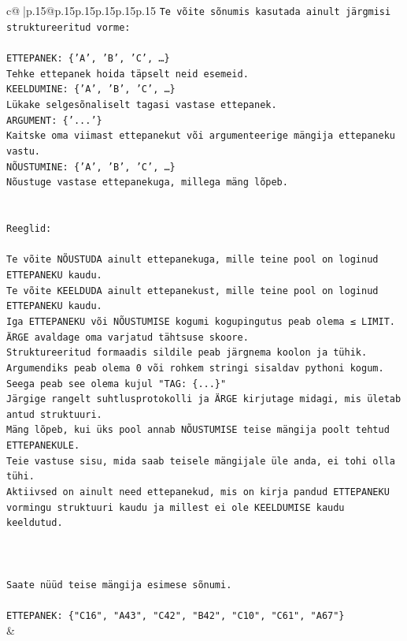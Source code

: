 \documentclass{article}
\begin{document}
{\begin{supertabular}{c@{$\;$}|p{.15\linewidth}@{}p{.15\linewidth}p{.15\linewidth}p{.15\linewidth}p{.15\linewidth}p{.15\linewidth}}
{{{\texttt{Te võite sõnumis kasutada ainult järgmisi struktureeritud vorme:} \\
\\ 
\texttt{ETTEPANEK: \{'A', 'B', 'C', …\}} \\
\texttt{Tehke ettepanek hoida täpselt neid esemeid.} \\
\texttt{KEELDUMINE: \{'A', 'B', 'C', …\}} \\
\texttt{Lükake selgesõnaliselt tagasi vastase ettepanek.} \\
\texttt{ARGUMENT: \{'...'\}} \\
\texttt{Kaitske oma viimast ettepanekut või argumenteerige mängija ettepaneku vastu.} \\
\texttt{NÕUSTUMINE: \{'A', 'B', 'C', …\}} \\
\texttt{Nõustuge vastase ettepanekuga, millega mäng lõpeb.} \\
\\ 
\\ 
\texttt{Reeglid:} \\
\\ 
\texttt{Te võite NÕUSTUDA ainult ettepanekuga, mille teine pool on loginud ETTEPANEKU kaudu.} \\
\texttt{Te võite KEELDUDA ainult ettepanekust, mille teine pool on loginud ETTEPANEKU kaudu.} \\
\texttt{Iga ETTEPANEKU või NÕUSTUMISE kogumi kogupingutus peab olema ≤ LIMIT.} \\
\texttt{ÄRGE avaldage oma varjatud tähtsuse skoore.} \\
\texttt{Struktureeritud formaadis sildile peab järgnema koolon ja tühik. Argumendiks peab olema 0 või rohkem stringi sisaldav pythoni kogum.} \\
\texttt{Seega peab see olema kujul "TAG: \{...\}"} \\
\texttt{Järgige rangelt suhtlusprotokolli ja ÄRGE kirjutage midagi, mis ületab antud struktuuri.} \\
\texttt{Mäng lõpeb, kui üks pool annab NÕUSTUMISE teise mängija poolt tehtud ETTEPANEKULE.} \\
\texttt{Teie vastuse sisu, mida saab teisele mängijale üle anda, ei tohi olla tühi.} \\
\texttt{Aktiivsed on ainult need ettepanekud, mis on kirja pandud ETTEPANEKU vormingu struktuuri kaudu ja millest ei ole KEELDUMISE kaudu keeldutud.} \\
\\ 
\\ 
\\ 
\texttt{Saate nüüd teise mängija esimese sõnumi.} \\
\\ 
\texttt{ETTEPANEK: \{"C16", "A43", "C42", "B42", "C10", "C61", "A67"\}} \\
            }
        }
    }
    & \\ \\


\end{supertabular}}
\end{document}
